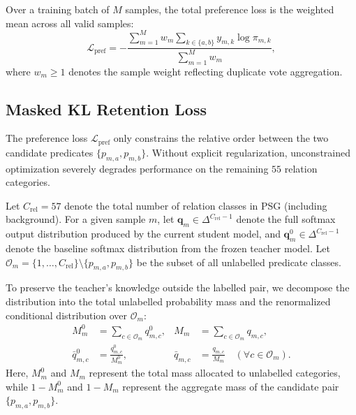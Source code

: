 \documentclass[10pt,twocolumn,letterpaper]{article}
\begin{document}
Over a training batch of $M$ samples, the total preference loss is the weighted mean across all valid samples:
\begin{equation}
    \mathcal{L}_{\mathrm{pref}} = -\frac{\sum_{m=1}^M w_m \sum_{k\in\{a,b\}} y_{m,k}\log \pi_{m,k}}{\sum_{m=1}^M w_m},
    \label{eq:pref_loss}
\end{equation}
where $w_m \ge 1$ denotes the sample weight reflecting duplicate vote aggregation.

\subsection{Masked KL Retention Loss}

The preference loss $\mathcal{L}_{\mathrm{pref}}$ only constrains the relative order between the two candidate predicates $\{p_{m,a}, p_{m,b}\}$. Without explicit regularization, unconstrained optimization severely degrades performance on the remaining $55$ relation categories.

Let $C_{\mathrm{rel}} = 57$ denote the total number of relation classes in PSG (including background). For a given sample $m$, let $\mathbf{q}_m \in \Delta^{C_{\mathrm{rel}}-1}$ denote the full softmax output distribution produced by the current student model, and $\mathbf{q}_m^0 \in \Delta^{C_{\mathrm{rel}}-1}$ denote the baseline softmax distribution from the frozen teacher model. Let $\mathcal{O}_m = \{1, \dots, C_{\mathrm{rel}}\} \setminus \{p_{m,a}, p_{m,b}\}$ be the subset of all unlabelled predicate classes.

To preserve the teacher's knowledge outside the labelled pair, we decompose the distribution into the total unlabelled probability mass and the renormalized conditional distribution over $\mathcal{O}_m$:
\begin{align}
    M_m^0 &= \sum_{c\in\mathcal{O}_m} q_{m,c}^0, & M_m &= \sum_{c\in\mathcal{O}_m} q_{m,c}, \\
    \bar{q}_{m,c}^0 &= \frac{q_{m,c}^0}{M_m^0}, & \bar{q}_{m,c} &= \frac{q_{m,c}}{M_m} \quad (\forall c \in \mathcal{O}_m).
\end{align}
Here, $M_m^0$ and $M_m$ represent the total mass allocated to unlabelled categories, while $1 - M_m^0$ and $1 - M_m$ represent the aggregate mass of the candidate pair $\{p_{m,a}, p_{m,b}\}$. 
\end{document}
